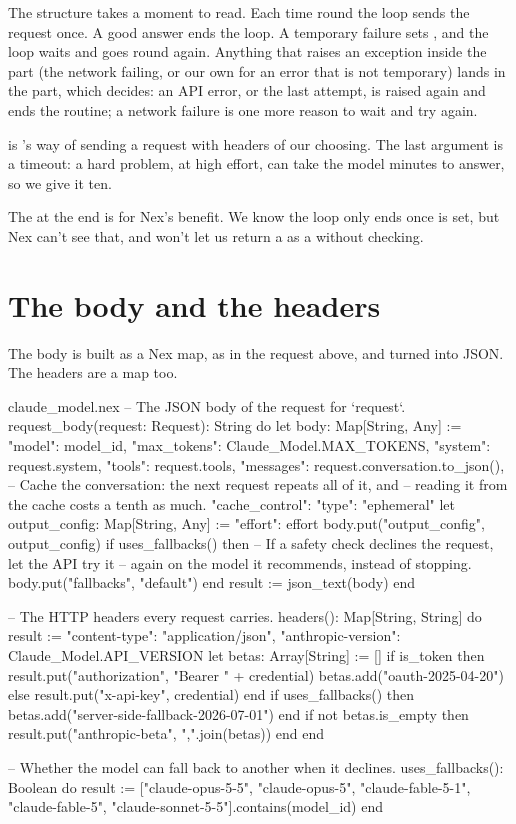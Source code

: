The structure takes a moment to read. Each time round the loop sends the
request once. A good answer ends the loop. A temporary failure sets
, and the loop waits and goes round again. Anything that
raises an exception inside the  part (the network failing, or our
own  for an error that is not temporary) lands in the
 part, which decides: an API error, or the last attempt, is
raised again and ends the routine; a network failure is one more reason
to wait and try again.

 is 's way of sending a request
with headers of our choosing. The last argument is a timeout: a hard
problem, at high effort, can take the model minutes to answer, so we give
it ten.

The  at the end is for Nex's benefit. We know the
loop only ends once  is set, but Nex can't see that, and
won't let us return a  as a  without checking.

\section{The body and the headers}

The body is built as a Nex map, as in the request above, and turned into
JSON. The headers are a map too.

\begin{continued}{claude_model.nex}
  -- The JSON body of the request for `request`.
  request_body(request: Request): String do
    let body: Map[String, Any] := {
      "model": model_id,
      "max_tokens": Claude_Model.MAX_TOKENS,
      "system": request.system,
      "tools": request.tools,
      "messages": request.conversation.to_json(),
      -- Cache the conversation: the next request repeats all of it, and
      -- reading it from the cache costs a tenth as much.
      "cache_control": {"type": "ephemeral"}
    }
    let output_config: Map[String, Any] := {"effort": effort}
    body.put("output_config", output_config)
    if uses_fallbacks() then
      -- If a safety check declines the request, let the API try it
      -- again on the model it recommends, instead of stopping.
      body.put("fallbacks", "default")
    end
    result := json_text(body)
  end

  -- The HTTP headers every request carries.
  headers(): Map[String, String] do
    result := {"content-type": "application/json",
      "anthropic-version": Claude_Model.API_VERSION}
    let betas: Array[String] := []
    if is_token then
      result.put("authorization", "Bearer " + credential)
      betas.add("oauth-2025-04-20")
    else
      result.put("x-api-key", credential)
    end
    if uses_fallbacks() then
      betas.add("server-side-fallback-2026-07-01")
    end
    if not betas.is_empty then
      result.put("anthropic-beta", ",".join(betas))
    end
  end

  -- Whether the model can fall back to another when it declines.
  uses_fallbacks(): Boolean do
    result := ["claude-opus-5-5", "claude-opus-5", "claude-fable-5-1", "claude-fable-5",
      "claude-sonnet-5-5"].contains(model_id)
  end
\end{continued}

